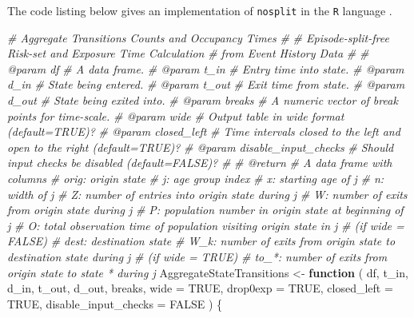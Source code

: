 \documentclass[10pt, twoside]{article}
\newenvironment{Shaded}{}{}
\newcommand{\AttributeTok}[1]{#1}
\newcommand{\CommentTok}[1]{\textit{#1}}
\newcommand{\ConstantTok}[1]{#1}
\newcommand{\ControlFlowTok}[1]{\textbf{#1}}
\newcommand{\NormalTok}[1]{#1}
\newcommand{\OtherTok}[1]{#1}
\begin{document}
The code listing below gives an implementation of \texttt{nosplit} in the \texttt{R} language \citep{RCT2020}.

\footnotesize

\begin{Shaded}
\begin{Highlighting}[]
\CommentTok{\# Aggregate Transitions Counts and Occupancy Times}
\CommentTok{\#}
\CommentTok{\# Episode{-}split{-}free Risk{-}set and Exposure Time Calculation}
\CommentTok{\# from Event History Data}
\CommentTok{\#}
\CommentTok{\# @param df}
\CommentTok{\#   A data frame.}
\CommentTok{\# @param t\_in}
\CommentTok{\#   Entry time into state.}
\CommentTok{\# @param d\_in}
\CommentTok{\#   State being entered.}
\CommentTok{\# @param t\_out}
\CommentTok{\#   Exit time from state.}
\CommentTok{\# @param d\_out}
\CommentTok{\#   State being exited into.}
\CommentTok{\# @param breaks}
\CommentTok{\#   A numeric vector of break points for time{-}scale.}
\CommentTok{\# @param wide}
\CommentTok{\#   Output table in wide format (default=TRUE)?}
\CommentTok{\# @param closed\_left}
\CommentTok{\#   Time intervals closed to the left and open to the right (default=TRUE)?}
\CommentTok{\# @param disable\_input\_checks}
\CommentTok{\#   Should input checks be disabled (default=FALSE)?}
\CommentTok{\#}
\CommentTok{\# @return}
\CommentTok{\#   A data frame with columns}
\CommentTok{\#     orig: origin state}
\CommentTok{\#     j:    age group index}
\CommentTok{\#     x:    starting age of j}
\CommentTok{\#     n:    width of j}
\CommentTok{\#     Z:    number of entries into origin state during j}
\CommentTok{\#     W:    number of exits from origin state during j}
\CommentTok{\#     P:    population number in origin state at beginning of j}
\CommentTok{\#     O:    total observation time of population visiting origin state in j}
\CommentTok{\#     (if wide = FALSE)}
\CommentTok{\#     dest: destination state}
\CommentTok{\#     W\_k:  number of exits from origin state to destination state during j}
\CommentTok{\#     (if wide = TRUE)}
\CommentTok{\#     to\_*: number of exits from origin state to state * during j}
\NormalTok{AggregateStateTransitions }\OtherTok{\textless{}{-}} \ControlFlowTok{function}\NormalTok{ (}
\NormalTok{  df,}
\NormalTok{  t\_in, d\_in, t\_out, d\_out,}
\NormalTok{  breaks,}
  \AttributeTok{wide =} \ConstantTok{TRUE}\NormalTok{, }\AttributeTok{drop0exp =} \ConstantTok{TRUE}\NormalTok{,}
  \AttributeTok{closed\_left =} \ConstantTok{TRUE}\NormalTok{,}
  \AttributeTok{disable\_input\_checks =} \ConstantTok{FALSE}
\NormalTok{) \{}


\end{Highlighting}
\end{Shaded}
\end{document}
